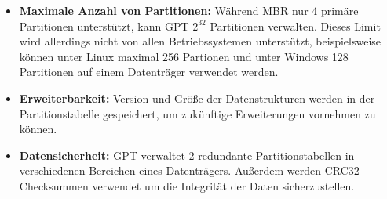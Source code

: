 \begin{itemize}
    \item \textbf{Maximale Anzahl von Partitionen:}
    Während MBR nur 4 primäre Partitionen unterstützt, kann GPT $ 2^{32} $ Partitionen verwalten.
    Dieses Limit wird allerdings nicht von allen Betriebssystemen unterstützt, beispielsweise können unter Linux maximal 256 Partionen und unter Windows 128 Partitionen auf einem Datenträger verwendet werden.

    \item \textbf{Erweiterbarkeit:} Version und Größe der Datenstrukturen werden in der Partitionstabelle gespeichert, um zukünftige Erweiterungen vornehmen zu können.

    \item \textbf{Datensicherheit:} GPT verwaltet 2 redundante Partitionstabellen in verschiedenen Bereichen eines Datenträgers.
    Außerdem werden CRC32 Checksummen verwendet um die Integrität der Daten sicherzustellen.

\end{itemize}
